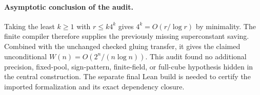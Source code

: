 \documentclass[11pt]{article}
\begin{document}
\paragraph{Asymptotic conclusion of the audit.}
Taking the least $k\geq1$ with $r\leq k4^k$ gives
$4^k=O(r/\log r)$ by minimality. The finite compiler therefore supplies
the previously missing superconstant saving. Combined with the unchanged
checked gluing transfer, it gives the claimed unconditional
$W(n)=O(2^n/(n\log n))$. This audit found no additional precision,
fixed-pool, sign-pattern, finite-field, or full-cube hypothesis hidden
in the central construction. The separate final Lean build is needed
to certify the imported formalization and its exact dependency closure.
\end{document}
